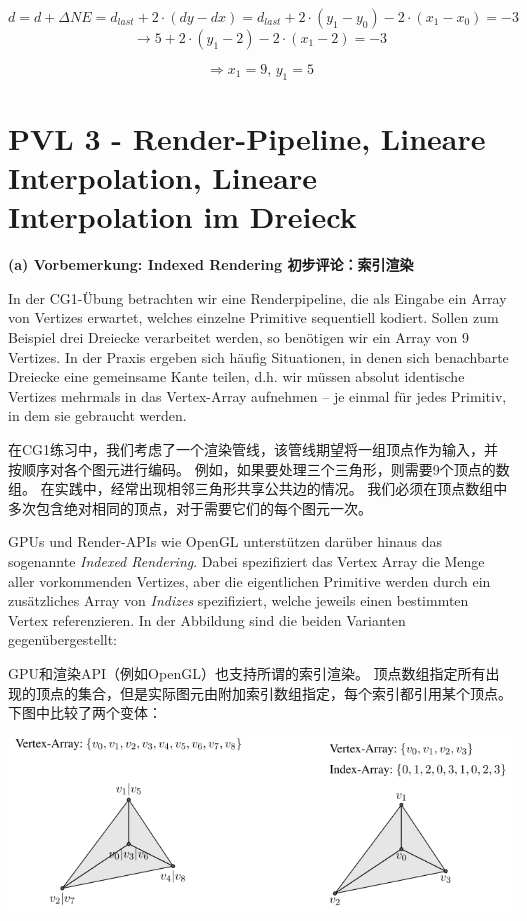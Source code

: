 \documentclass[fleqn]{article}
\begin{document}
$$d=d+\Delta NE=d_{last}+2\cdot(dy-dx)=d_{last}+2\cdot(y_1-y_0)-2\cdot(x_1-x_0)=-3$$
$$\rightarrow 5+2\cdot(y_1-2)-2\cdot(x_1-2)=-3$$

$$\Rightarrow x_1=9,\,y_1=5$$

\newpage

\section{PVL 3 - Render-Pipeline, Lineare Interpolation, Lineare Interpolation im Dreieck}

\noindent\textbf{(a) Vorbemerkung: Indexed Rendering 初步评论：索引渲染}

In der CG1-Übung betrachten wir eine Renderpipeline, 
die als Eingabe ein Array von Vertizes erwartet, 
welches einzelne Primitive sequentiell kodiert. 
Sollen zum Beispiel drei Dreiecke verarbeitet werden, 
so benötigen wir ein Array von 9 Vertizes. 
In der Praxis ergeben sich häufig Situationen, 
in denen sich benachbarte Dreiecke eine gemeinsame Kante teilen, 
d.h. wir müssen absolut identische Vertizes mehrmals in das Vertex-Array aufnehmen – je einmal für jedes Primitiv, 
in dem sie gebraucht werden. 

在CG1练习中，我们考虑了一个渲染管线，该管线期望将一组顶点作为输入，并按顺序对各个图元进行编码。 例如，如果要处理三个三角形，则需要9个顶点的数组。 在实践中，经常出现相邻三角形共享公共边的情况。 我们必须在顶点数组中多次包含绝对相同的顶点，对于需要它们的每个图元一次。

GPUs und Render-APIs wie OpenGL unterstützen darüber hinaus das sogenannte \textit{Indexed Rendering}.
 Dabei spezifiziert das Vertex Array die Menge aller vorkommenden Vertizes, 
 aber die eigentlichen Primitive werden durch ein zusätzliches Array von \textit{Indizes} spezifiziert, welche jeweils einen bestimmten Vertex referenzieren. In der Abbildung sind die beiden Varianten gegenübergestellt:

GPU和渲染API（例如OpenGL）也支持所谓的索引渲染。 顶点数组指定所有出现的顶点的集合，但是实际图元由附加索引数组指定，每个索引都引用某个顶点。 下图中比较了两个变体：

\begin{center}
    \includegraphics[scale=0.6]{14.png}
\end{center}
\end{document}
